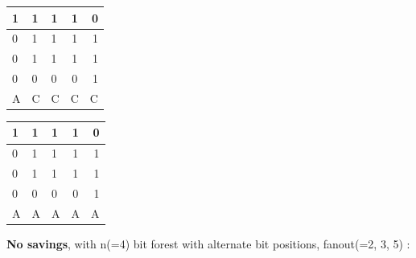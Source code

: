 	\begin{multicols}{2}

		\begin{tabular}{ l | l l c r }
		  1 & 1 & 1 & 1 & 0 \\
		  \hline
		  0 & 1 & 1 & 1 & 1 \\
		  0 & 1 & 1 & 1 & 1 \\
		  0 & 0 & 0 & 0 & 1 \\
		  \hline	
		  A & C & C & C & C\\
		\end{tabular}
	\columnbreak{|}
		\begin{tabular}{ l | l l c r }
		  1 & 1 & 1 & 1 & 0 \\
		  \hline
		  0 & 1 & 1 & 1 & 1 \\
		  0 & 1 & 1 & 1 & 1 \\
		  0 & 0 & 0 & 0 & 1 \\
		  \hline	
		  A & A & A & A & A\\
		\end{tabular}
	\end{multicols}

	\textbf{No savings}, with n(=4) bit forest with alternate bit positions, fanout(=2, 3, 5) :

